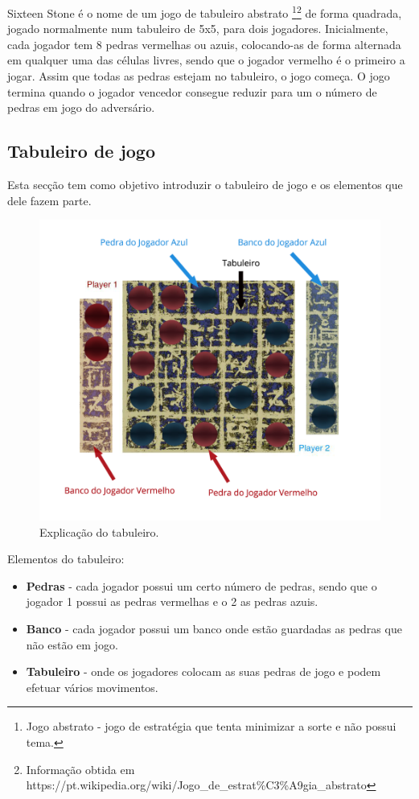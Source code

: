 \documentclass[a4paper]{article}
\begin{document}
Sixteen Stone é o nome de um jogo de tabuleiro abstrato \footnote{Jogo abstrato - jogo de estratégia que tenta minimizar a sorte e não possui tema.}\footnote{Informação obtida em https://pt.wikipedia.org/wiki/Jogo\_de\_estrat\%C3\%A9gia\_abstrato} de forma quadrada, jogado normalmente num tabuleiro de 5x5, para dois jogadores. Inicialmente, cada jogador tem 8 pedras vermelhas ou azuis, colocando-as de forma alternada em qualquer uma das células livres, sendo que o jogador vermelho é o primeiro a jogar. Assim que todas as pedras estejam no tabuleiro, o jogo começa. O jogo termina quando o jogador vencedor consegue reduzir para um o número de pedras em jogo do adversário.

\subsection{Tabuleiro de jogo}

Esta secção tem como objetivo introduzir o tabuleiro de jogo e os elementos que dele fazem parte.

\begin{figure}[!htb]
	\centering
	\includegraphics[scale=0.3]{images/board_explained.png} 
	\caption{Explicação do tabuleiro.}
\end{figure}

Elementos do tabuleiro:

\begin{itemize}
	\item \textbf{Pedras} - cada jogador possui um certo número de pedras, sendo que o jogador 1 possui as pedras vermelhas e o 2 as pedras azuis.
	\item \textbf{Banco} - cada jogador possui um banco onde estão guardadas as pedras que não estão em jogo.
	\item \textbf{Tabuleiro} -  onde os jogadores colocam as suas pedras de jogo e podem efetuar vários movimentos.
\end{itemize}
\end{document}
